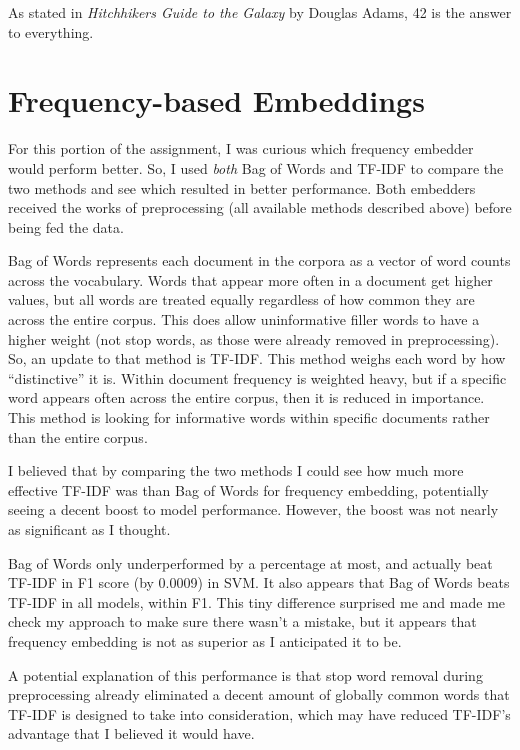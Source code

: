 \documentclass[12pt]{article}
\begin{document}
 As stated in \textit{Hitchhikers Guide to the Galaxy} by Douglas Adams, 42 is the answer to everything.

\section{Frequency-based Embeddings} \label{freq_embed}

For this portion of the assignment, I was curious which frequency embedder would perform better. So, 
I used \textit{both} Bag of Words and TF-IDF to compare the two methods and see which resulted in 
better performance. Both embedders received the works of preprocessing (all available methods described above) 
before being fed the data.

Bag of Words represents each document in the corpora as a vector of word counts across the vocabulary. 
Words that appear more often in a document get higher values, but all words are treated equally regardless 
of how common they are across the entire corpus. This does allow uninformative filler words to have a higher 
weight (not stop words, as those were already removed in preprocessing). So, an update to that method is 
TF-IDF. This method weighs each word by how ``distinctive'' it is. Within document frequency is weighted 
heavy, but if a specific word appears often across the entire corpus, then it is reduced in importance. 
This method is looking for informative words within specific documents rather than the entire corpus.

I believed that by comparing the two methods I could see how much more effective TF-IDF was than Bag 
of Words for frequency embedding, potentially seeing a decent boost to model performance. However, the 
boost was not nearly as significant as I thought. 

Bag of Words only underperformed by a percentage at most, and actually beat TF-IDF in F1 score (by 0.0009)
in SVM. It also appears that Bag of Words beats TF-IDF in all models, within F1. 
This tiny difference surprised me and made me check my approach to make sure there wasn't a mistake, but 
it appears that frequency embedding is not as superior as I anticipated it to be.

A potential explanation of this performance is that stop word removal during preprocessing already eliminated 
a decent amount of globally common words that TF-IDF is designed to take into consideration, which may 
have reduced TF-IDF's advantage that I believed it would have.
\end{document}

